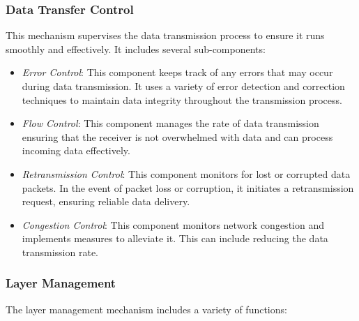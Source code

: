 \documentclass{ieeeaccess}
\begin{document}
\subsubsection{Data Transfer Control} 
This mechanism supervises the data transmission process to ensure it runs smoothly and effectively. It includes several sub-components:
\begin{itemize}
	\item \textit{Error Control}: This component keeps track of any errors that may occur during data transmission. It uses a variety of error detection and correction techniques to maintain data integrity throughout the transmission process.
	\item \textit{Flow Control}: This component manages the rate of data transmission ensuring that the receiver is not overwhelmed with data and can process incoming data effectively.
	\item \textit{Retransmission Control}: This component monitors for lost or corrupted data packets. In the event of packet loss or corruption, it initiates a retransmission request, ensuring reliable data delivery.
	\item \textit{Congestion Control}: This component monitors network congestion and implements measures to alleviate it. This can include reducing the data transmission rate.
\end{itemize}

\subsubsection{Layer Management}
The layer management mechanism includes a variety of functions:
\end{document}
